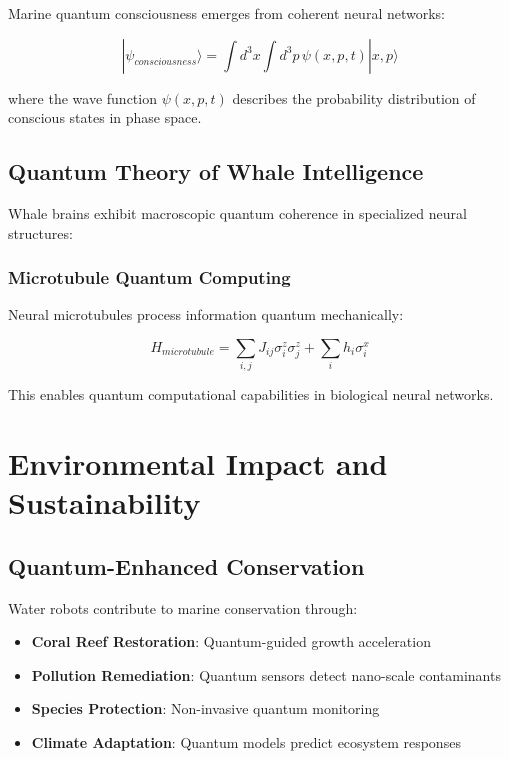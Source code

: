 \documentclass[11pt,a4paper]{article}
\begin{document}
Marine quantum consciousness emerges from coherent neural networks:

\begin{equation}
|\psi_{consciousness}\rangle = \int d^3x \int d^3p \, \psi(x,p,t) |x,p\rangle
\end{equation}

where the wave function $\psi(x,p,t)$ describes the probability distribution of conscious states in phase space.

\subsection{Quantum Theory of Whale Intelligence}

Whale brains exhibit macroscopic quantum coherence in specialized neural structures:

\subsubsection{Microtubule Quantum Computing}

Neural microtubules process information quantum mechanically:

\begin{equation}
H_{microtubule} = \sum_{i,j} J_{ij} \sigma_i^z \sigma_j^z + \sum_i h_i \sigma_i^x
\end{equation}

This enables quantum computational capabilities in biological neural networks.

\section{Environmental Impact and Sustainability}

\subsection{Quantum-Enhanced Conservation}

Water robots contribute to marine conservation through:

\begin{itemize}
    \item \textbf{Coral Reef Restoration}: Quantum-guided growth acceleration
    \item \textbf{Pollution Remediation}: Quantum sensors detect nano-scale contaminants
    \item \textbf{Species Protection}: Non-invasive quantum monitoring
    \item \textbf{Climate Adaptation}: Quantum models predict ecosystem responses
\end{itemize}
\end{document}
